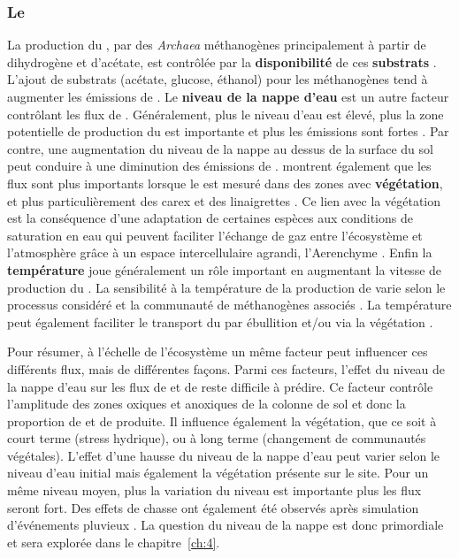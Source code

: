 \subsubsection{Le \chh}

La production du \chh, par des \textit{Archaea} méthanogènes principalement à partir de dihydrogène et d'acétate, est contrôlée par la \textbf{disponibilité} de ces \textbf{substrats} \citep{segers1998}.
L'ajout de substrats (acétate, glucose, éthanol) pour les méthanogènes tend à augmenter les émissions de \chh \citep{coles2002}.
Le \textbf{niveau de la nappe d'eau} est un autre facteur contrôlant les flux de \chh.
Généralement, plus le niveau d'eau est élevé, plus la zone potentielle de production du \chh est importante et plus les émissions sont fortes \citep{pelletier2007}.
Par contre, une augmentation du niveau de la nappe au dessus de la surface du sol peut conduire à une diminution des émissions de \chh \citep{bubier1995}.
\citet{pelletier2007} montrent également que les flux sont plus importants lorsque le \chh est mesuré dans des zones avec \textbf{végétation}, et plus particulièrement des carex et des linaigrettes \citep{gogo2011}.
Ce lien avec la végétation est la conséquence d'une adaptation de certaines espèces aux conditions de saturation en eau qui peuvent faciliter l'échange de gaz entre l'écosystème et l'atmosphère grâce à un espace intercellulaire agrandi, l'Aerenchyme \citep{rydin2013d}.
Enfin la \textbf{température} joue généralement un rôle important en augmentant la vitesse de production du \chh.
La sensibilité à la température de la production de \chh varie selon le processus considéré et la communauté de méthanogènes associés \citep{segers1998}.
La température peut également faciliter le transport du \chh par ébullition et/ou via la végétation \citep{lai2009}.

Pour résumer, à l'échelle de l'écosystème un même facteur peut influencer ces différents flux, mais de différentes façons.
Parmi ces facteurs, l'effet du niveau de la nappe d'eau sur les flux de \coo et de \chh reste difficile à prédire.
Ce facteur contrôle l'amplitude des zones oxiques et anoxiques de la colonne de sol et donc la proportion de \coo et de \chh produite.
Il influence également la végétation, que ce soit à court terme (stress hydrique), ou à long terme (changement de communautés végétales).
L'effet d'une hausse du niveau de la nappe d'eau peut varier selon le niveau d'eau initial mais également la végétation présente sur le site.
Pour un même niveau moyen, plus la variation du niveau est importante plus les flux seront fort.
Des effets de chasse ont également été observés après simulation d’événements pluvieux \citep{strack2009}.
La question du niveau de la nappe est donc primordiale et sera explorée dans le chapitre~\ref{ch:4}.


